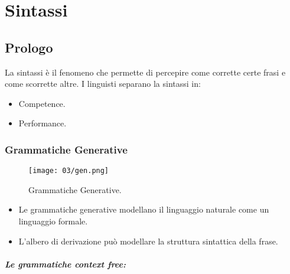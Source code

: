 \chapter{Sintassi}

\section{Prologo}

La sintassi è il fenomeno che permette di percepire come corrette certe frasi e come scorrette altre. I linguisti separano la sintassi in:
\begin{itemize}
  \item Competence. 
  \item Performance.
\end{itemize}





\subsection{Grammatiche Generative}


\begin{figure}[h]
    \centering
    \texttt{[image: 03/gen.png]}
    \caption{Grammatiche Generative.}
\end{figure}

\begin{itemize}
  \item Le grammatiche generative modellano il linguaggio naturale come un linguaggio formale. 
  \item L'albero di derivazione può modellare la struttura sintattica della frase. 
\end{itemize}

\paragraph{Le grammatiche context free:}

